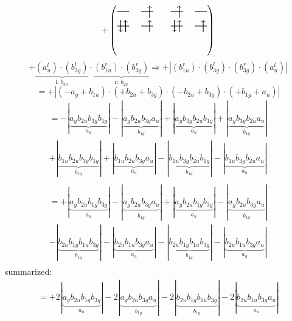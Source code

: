 \documentclass{article}
\begin{document}
\[+\left(\begin{tikzpicture}
    \draw[thick] (0,0) -- (0.5,0); %
    \draw[thick] (1,0) -- (1.5,0); %
    \draw[thick] (0,-0.6) -- (0.5,-0.6); %
    \draw[thick] (1,-0.6) -- (1.5,-0.6); %
\draw[->, thick] (1.35, -0.25) -- (1.35, 0.25); 
\draw[-> , thick] (0.35, -0.85) -- (0.35, -0.35); 
\draw[<- , thick] (0.15, -0.85) -- (0.15, -0.35); 
 \draw[-> , thick] (1.35, -0.85) -- (1.35, -0.35); 
\end{tikzpicture}\qquad \begin{tikzpicture}
    \draw[thick] (0,0) -- (0.5,0); %
    \draw[thick] (1,0) -- (1.5,0); %
    \draw[thick] (0,-0.6) -- (0.5,-0.6); %
    \draw[thick] (1,-0.6) -- (1.5,-0.6); %
\draw[->, thick] (0.35, -0.25) -- (0.35, 0.25); 
\draw[-> , thick] (0.35, -0.85) -- (0.35, -0.35); 
\draw[<- , thick] (0.15, -0.85) -- (0.15, -0.35); 
 \draw[-> , thick] (1.35, -0.85) -- (1.35, -0.35); 
\end{tikzpicture}\right)\]$$+ \underbrace{(a_{u}^{l})\cdot (b_{3g}^{l})}_{\text{l: }b_{3u}}\cdot \underbrace{(b_{1u}^{r})\cdot (b_{3g}^{r})}_{\text{r: }b_{2u}}\Rightarrow +\left|(b_{1u}^{r}) \cdot (b_{3g}^{l}) \cdot (b_{3g}^{r}) \cdot (a_{u}^{l})\right|$$$$=+\left|(-a_{g}+b_{1u}) \cdot (+b_{2u}+b_{3g}) \cdot (-b_{2u}+b_{3g}) \cdot (+b_{1g}+a_{u})\right|$$\begin{multline*}
=-\left|\underbrace{a_{g} b_{2u} b_{3g} b_{1g}}_{a_{u}}\right|-\left|\underbrace{a_{g} b_{2u} b_{3g} a_{u}}_{b_{1g}}\right|+\left|\underbrace{a_{g} b_{3g} b_{2u} b_{1g}}_{a_{u}}\right|+\left|\underbrace{a_{g} b_{3g} b_{2u} a_{u}}_{b_{1g}}\right|\\
+\left|\underbrace{b_{1u} b_{2u} b_{3g} b_{1g}}_{b_{1g}}\right|+\left|\underbrace{b_{1u} b_{2u} b_{3g} a_{u}}_{a_{u}}\right|-\left|\underbrace{b_{1u} b_{3g} b_{2u} b_{1g}}_{b_{1g}}\right|-\left|\underbrace{b_{1u} b_{3g} b_{2u} a_{u}}_{a_{u}}\right|\\
\end{multline*}\begin{multline*}
=+\left|\underbrace{a_{g} b_{2u} b_{1g} b_{3g}}_{a_{u}}\right|-\left|\underbrace{a_{g} b_{2u} b_{3g} a_{u}}_{b_{1g}}\right|+\left|\underbrace{a_{g} b_{2u} b_{1g} b_{3g}}_{a_{u}}\right|-\left|\underbrace{a_{g} b_{2u} b_{3g} a_{u}}_{b_{1g}}\right|\\
-\left|\underbrace{b_{2u} b_{1g} b_{1u} b_{3g}}_{b_{1g}}\right|-\left|\underbrace{b_{2u} b_{1u} b_{3g} a_{u}}_{a_{u}}\right|-\left|\underbrace{b_{2u} b_{1g} b_{1u} b_{3g}}_{b_{1g}}\right|-\left|\underbrace{b_{2u} b_{1u} b_{3g} a_{u}}_{a_{u}}\right|\\
\end{multline*}summarized:\begin{multline*}
=+2\left|\underbrace{a_{g} b_{2u} b_{1g} b_{3g}}_{a_{u}}\right|-2\left|\underbrace{a_{g} b_{2u} b_{3g} a_{u}}_{b_{1g}}\right|-2\left|\underbrace{b_{2u} b_{1g} b_{1u} b_{3g}}_{b_{1g}}\right|-2\left|\underbrace{b_{2u} b_{1u} b_{3g} a_{u}}_{a_{u}}\right|\\
\end{multline*}\\ \\
\end{document}

